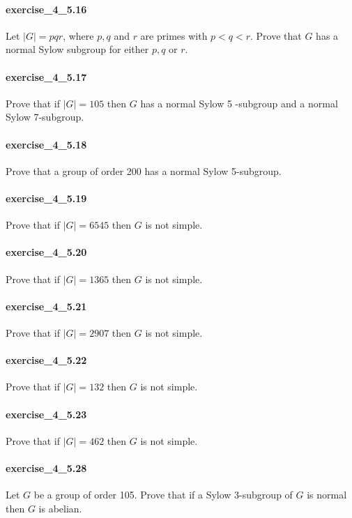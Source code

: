 \documentclass{article}
\begin{document}
\paragraph{exercise\_4\_5.16} Let $|G|=p q r$, where $p, q$ and $r$ are primes with $p<q<r$. Prove that $G$ has a normal Sylow subgroup for either $p, q$ or $r$.

\paragraph{exercise\_4\_5.17} Prove that if $|G|=105$ then $G$ has a normal Sylow 5 -subgroup and a normal Sylow 7-subgroup.

\paragraph{exercise\_4\_5.18} Prove that a group of order 200 has a normal Sylow 5-subgroup.

\paragraph{exercise\_4\_5.19} Prove that if $|G|=6545$ then $G$ is not simple.

\paragraph{exercise\_4\_5.20} Prove that if $|G|=1365$ then $G$ is not simple.

\paragraph{exercise\_4\_5.21} Prove that if $|G|=2907$ then $G$ is not simple.

\paragraph{exercise\_4\_5.22} Prove that if $|G|=132$ then $G$ is not simple.

\paragraph{exercise\_4\_5.23} Prove that if $|G|=462$ then $G$ is not simple.

\paragraph{exercise\_4\_5.28} Let $G$ be a group of order 105. Prove that if a Sylow 3-subgroup of $G$ is normal then $G$ is abelian.
\end{document}
